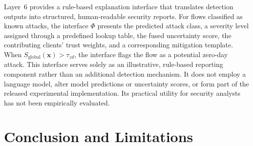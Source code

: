 \documentclass[pdflatex,sn-mathphys-num]{sn-jnl}
\begin{document}
{{{Layer~6 provides a rule-based explanation interface that translates detection outputs into structured, human-readable security reports. For flows classified as known attacks, the interface $\Phi$ presents the predicted attack class, a severity level assigned through a predefined lookup table, the fused uncertainty score, the contributing clients' trust weights, and a corresponding mitigation template. When $S_{\mathrm{global}}(\mathbf{x}) > \tau_{zd}$, the interface flags the flow as a potential zero-day attack. This interface serves solely as an illustrative, rule-based reporting component rather than an additional detection mechanism. It does not employ a language model, alter model predictions or uncertainty scores, or form part of the released experimental implementation. Its practical utility for security analysts has not been empirically evaluated.
\FloatBarrier
{\color{black}
\section{Conclusion and Limitations}
\label{sec:conclusion}

}}}}
\end{document}
